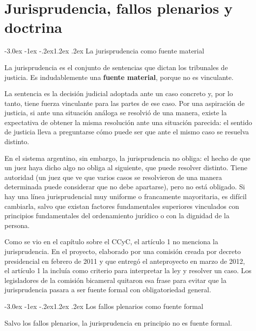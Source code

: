 \documentclass[12pt,oneside]{book}
\makeatletter
\renewcommand\section{\@startsection{section}{1}{\z@}%
  {-3.0ex \@plus -1ex \@minus -.2ex}{1.2ex \@plus .2ex}%
  {\normalfont\large\bfseries\color{acento}}}
\makeatother
\begin{document}

\chapter{Jurisprudencia, fallos plenarios y doctrina}
\section{La jurisprudencia como fuente material}

La jurisprudencia es el conjunto de sentencias que dictan los tribunales de justicia. Es indudablemente una \textbf{fuente material}, porque no es vinculante.

La sentencia es la decisión judicial adoptada ante un caso concreto y, por lo tanto, tiene fuerza vinculante para las partes de ese caso. Por una aspiración de justicia, si ante una situación análoga se resolvió de una manera, existe la expectativa de obtener la misma resolución ante una situación parecida: el sentido de justicia lleva a preguntarse cómo puede ser que ante el mismo caso se resuelva distinto.

En el sistema argentino, sin embargo, la jurisprudencia no obliga: el hecho de que un juez haya dicho algo no obliga al siguiente, que puede resolver distinto. Tiene autoridad (un juez que ve que varios casos se resolvieron de una manera determinada puede considerar que no debe apartarse), pero no está obligado. Si hay una línea jurisprudencial muy uniforme o francamente mayoritaria, es difícil cambiarla, salvo que existan factores fundamentales superiores vinculados con principios fundamentales del ordenamiento jurídico o con la dignidad de la persona.

Como se vio en el capítulo sobre el CCyC, el artículo 1 no menciona la jurisprudencia. En el proyecto, elaborado por una comisión creada por decreto presidencial en febrero de 2011 y que entregó el anteproyecto en marzo de 2012, el artículo 1 la incluía como criterio para interpretar la ley y resolver un caso. Los legisladores de la comisión bicameral quitaron esa frase para evitar que la jurisprudencia pasara a ser fuente formal con obligatoriedad general.

\section{Los fallos plenarios como fuente formal}

Salvo los fallos plenarios, la jurisprudencia en principio no es fuente formal.
\end{document}
